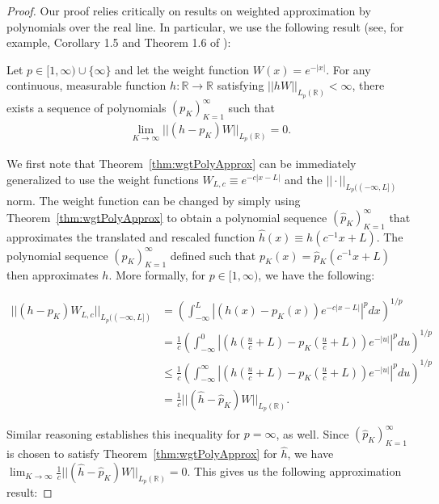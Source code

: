 \documentclass[11pt]{article}
\newcommand{\R}{\mathbb{R}}
\begin{document}
\begin{proof}
Our proof relies critically on results on weighted approximation by polynomials over the real line. In particular, we use the following result (see, for example, Corollary 1.5 and Theorem 1.6 of \cite{Lubinsky2007Survey}):

\begin{theorem}
\label{thm:wgtPolyApprox}
    Let $p \in [1,\infty) \cup \{\infty\}$ and let the weight function $W(x) = e^{-|x|}$. For any continuous, measurable function $h:\R \to \R$ satisfying $||h W||_{L_p(\R)} < \infty$, there exists a sequence of polynomials $(p_K)_{K=1}^\infty$ such that
    \begin{align}
       \lim_{K \to \infty} ||(h - p_K)W||_{L_p(\R)} = 0.
    \end{align}
\end{theorem}


We first note that Theorem~\ref{thm:wgtPolyApprox} can be immediately generalized to use the weight functions $W_{L,c} \equiv e^{-c|x-L|}$ and the $||\cdot||_{L_p((-\infty,L])}$ norm. The weight function can be changed by simply using Theorem~\ref{thm:wgtPolyApprox} to obtain a polynomial sequence $(\hat{p}_K)_{K=1}^\infty$ that approximates the translated and rescaled function $\hat{h}(x) \equiv h(c^{-1}x + L)$. The polynomial sequence $(p_K)_{K=1}^\infty$ defined such that $p_K(x) = \hat{p}_K(c^{-1}x + L)$ then approximates $h$. More formally, for $p \in [1,\infty)$, we have the following:

\begin{align}
    ||(h - p_K)W_{L,c}||_{L_p((-\infty,L])} 
    &= \left( \int_{-\infty}^L |(h(x) - p_K(x)) e^{-c|x-L|}|^p dx \right)^{1/p} \\
    &= \frac{1}{c} \left( \int_{-\infty}^0 |(h(\frac{u}{c} + L) - p_K(\frac{u}{c} + L)) e^{-|u|}|^p du \right)^{1/p} \\
    &\leq \frac{1}{c} \left( \int_{-\infty}^\infty |(h(\frac{u}{c} + L) - p_K(\frac{u}{c} + L)) e^{-|u|}|^p du \right)^{1/p} \\
    &= \frac{1}{c} ||(\hat{h} - \hat{p}_K)W||_{L_p(\R)}.
\end{align}

Similar reasoning establishes this inequality for $p = \infty$, as well. Since $(\hat{p}_K)_{K=1}^\infty$ is chosen to satisfy Theorem~\ref{thm:wgtPolyApprox} for $\hat{h}$, we have $\lim_{K \to \infty} \frac{1}{c} ||(\hat{h} - \hat{p}_K)W||_{L_p(\R)} = 0$. This gives us the following approximation result: 


\end{proof}
\end{document}
